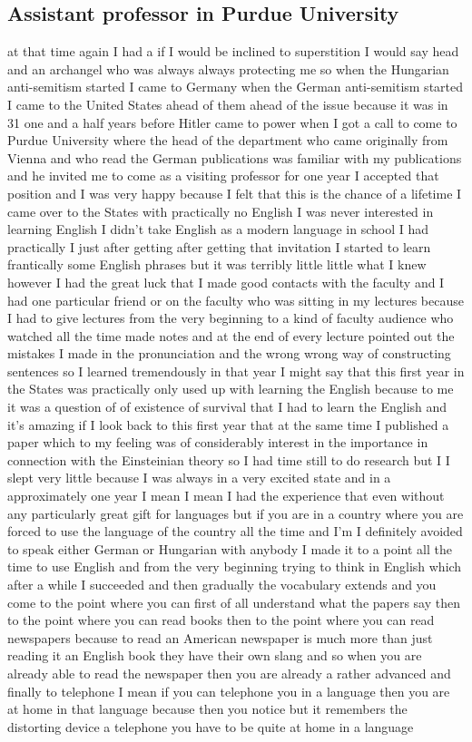 \documentclass{article}
\begin{document}
\subsection{Assistant professor in Purdue University}
at that time again I had a if I would be inclined to superstition I would say head and an archangel who was always always protecting me so when the Hungarian anti-semitism started I came to Germany when the German anti-semitism started I came to the United States ahead of them ahead of the issue because it was in 31 one and a half years before Hitler came to power when I got a call to come to Purdue University where the head of the department who came originally from Vienna and who read the German publications was familiar with my publications and he invited me to come as a visiting professor for one year I accepted that position and I was very happy because I felt that this is the chance of a lifetime I came over to the States with practically no English I was never interested in learning English I didn't take English as a modern language in school I had practically I just after getting after getting that invitation I started to learn frantically some English phrases but it was terribly little little what I knew however I had the great luck that I made good contacts with the faculty and I had one particular friend or on the faculty who was sitting in my lectures because I had to give lectures from the very beginning to a kind of faculty audience who watched all the time made notes and at the end of every lecture pointed out the mistakes I made in the pronunciation and the wrong wrong way of constructing sentences so I learned tremendously in that year I might say that this first year in the States was practically only used up with learning the English because to me it was a question of of existence of survival that I had to learn the English and it's amazing if I look back to this first year that at the same time I published a paper which to my feeling was of considerably interest in the importance in connection with the Einsteinian theory so I had time still to do research but I I slept very little because I was always in a very excited state and in a approximately one year I mean I mean I had the experience that even without any particularly great gift for languages but if you are in a country where you are forced to use the language of the country all the time and I'm I definitely avoided to speak either German or Hungarian with anybody I made it to a point all the time to use English and from the very beginning trying to think in English which after a while I succeeded and then gradually the vocabulary extends and you come to the point where you can first of all understand what the papers say then to the point where you can read books then to the point where you can read newspapers because to read an American newspaper is much more than just reading it an English book they have their own slang and so when you are already able to read the newspaper then you are already a rather advanced and finally to telephone I mean if you can telephone you in a language then you are at home in that language because then you notice but it remembers the distorting device a telephone you have to be quite at home in a language 
\end{document}
